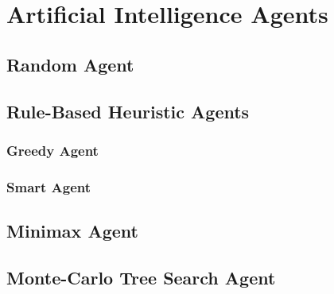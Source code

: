 \chapter{Artificial Intelligence Agents}
\label{AIAgents}

\section{Random Agent}

\section{Rule-Based Heuristic Agents}

\subsection{Greedy Agent}

\subsection{Smart Agent}

\section{Minimax Agent}
\label{minimax}

\section{Monte-Carlo Tree Search Agent}
\label{MCTS}
